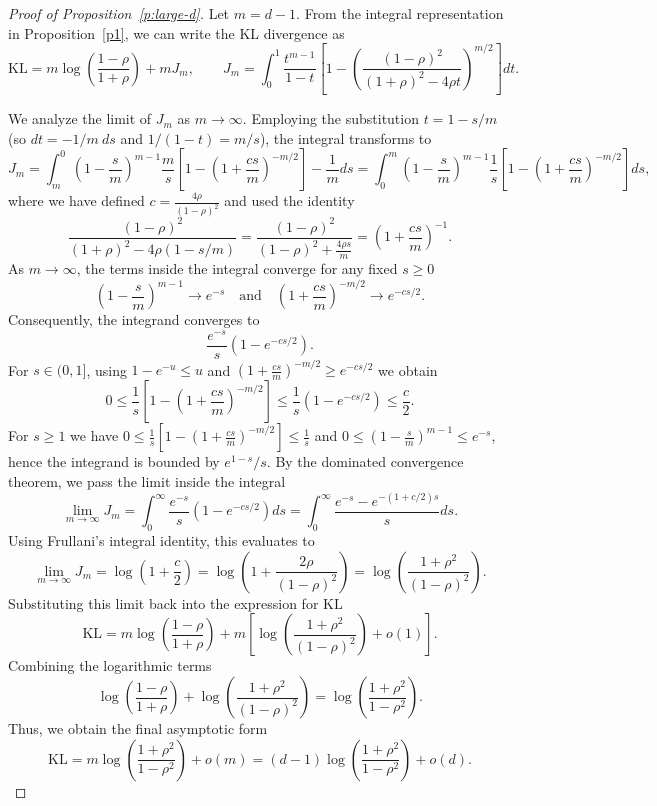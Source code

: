 \documentclass{article}
\begin{document}
\begin{proof}[Proof of Proposition~\ref{p:large-d}]
Let $m = d-1$. From the integral representation in Proposition~\ref{p1}, we can write the KL divergence as
\[
\mathrm{KL} = m\log\left(\frac{1-\rho}{1+\rho}\right) + m J_m, \qquad J_m = \int_0^1 \frac{t^{m-1}}{1-t} \left[ 1 - \left(\frac{(1-\rho)^2}{(1+\rho)^2-4\rho t}\right)^{m/2} \right] dt.
\]

We analyze the limit of $J_m$ as $m \to \infty$. Employing the substitution $t = 1 - s/m$ (so $dt = -1/m \ ds$ and $1/(1-t) = m/s$), the integral transforms to
\[
J_m = \int_m^0 \left(1-\frac{s}{m}\right)^{m-1} \frac{m}{s} \left[ 1 - \left(1+\frac{cs}{m}\right)^{-m/2} \right] -\frac{1}{m} ds = \int_0^m \left(1-\frac{s}{m}\right)^{m-1} \frac{1}{s} \left[ 1 - \left(1+\frac{cs}{m}\right)^{-m/2} \right] ds,
\]
where we have defined $c = \frac{4\rho}{(1-\rho)^2}$ and used the identity
\[
\frac{(1-\rho)^2}{(1+\rho)^2 - 4\rho(1-s/m)} = \frac{(1-\rho)^2}{(1-\rho)^2 + \frac{4\rho s}{m}} = \left(1 + \frac{cs}{m}\right)^{-1}.
\]
As $m \to \infty$, the terms inside the integral converge for any fixed $s \ge 0$
\[
\left(1-\frac{s}{m}\right)^{m-1} \to e^{-s} \quad \text{and} \quad \left(1+\frac{cs}{m}\right)^{-m/2} \to e^{-cs/2}.
\]
Consequently, the integrand converges to
\[
\frac{e^{-s}}{s}\left(1 - e^{-cs/2}\right).
\]
For $s\in(0,1]$, using $1-e^{-u}\le u$ and $(1+\frac{cs}{m})^{-m/2}\ge e^{-cs/2}$ we obtain
\[
0\le \frac{1}{s}\left[1-\left(1+\frac{cs}{m}\right)^{-m/2}\right]
\le \frac{1}{s}\left(1-e^{-cs/2}\right)\le \frac{c}{2}.
\]
For $s\ge 1$ we have $0\le \frac{1}{s}[1-(1+\frac{cs}{m})^{-m/2}]\le \frac{1}{s}$ and
$0\le (1-\frac{s}{m})^{m-1}\le e^{-s}$, hence the integrand is bounded by $e^{1-s}/s$. By the dominated convergence theorem, we pass the limit inside the integral
\[
\lim_{m\to\infty} J_m = \int_0^\infty \frac{e^{-s}}{s}\left(1 - e^{-cs/2}\right) ds = \int_0^\infty \frac{e^{-s} - e^{-(1+c/2)s}}{s} ds.
\]
Using Frullani's integral identity, this evaluates to
\[
\lim_{m\to\infty} J_m = \log\left(1 + \frac{c}{2}\right) = \log\left(1 + \frac{2\rho}{(1-\rho)^2}\right) = \log\left(\frac{1+\rho^2}{(1-\rho)^2}\right).
\]
Substituting this limit back into the expression for $\mathrm{KL}$
\[
\mathrm{KL} = m\log\left(\frac{1-\rho}{1+\rho}\right) + m\left[\log\left(\frac{1+\rho^2}{(1-\rho)^2}\right) + o(1)\right].
\]
Combining the logarithmic terms
\[
\log\left(\frac{1-\rho}{1+\rho}\right) + \log\left(\frac{1+\rho^2}{(1-\rho)^2}\right)= \log\left(\frac{1+\rho^2}{1-\rho^2}\right).
\]
Thus, we obtain the final asymptotic form
\[
\mathrm{KL} = m \log\left(\frac{1+\rho^2}{1-\rho^2}\right) + o(m) = (d-1)\log\left(\frac{1+\rho^2}{1-\rho^2}\right) + o(d).
\]
\end{proof}
\end{document}

